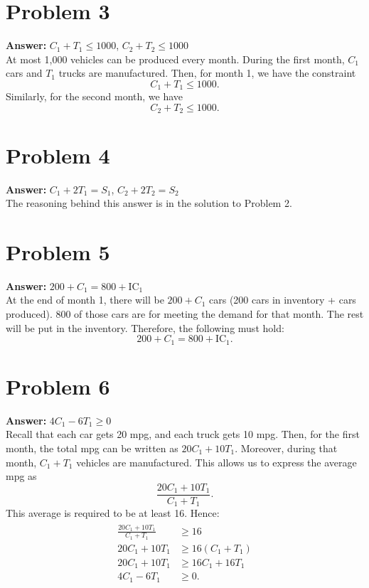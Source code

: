 \documentclass[11pt]{article}
\begin{document}
\section*{Problem 3}
\label{sec:org79f90ea}

\textbf{Answer:} \(C_1+T_1\leq 1000\), \(C_2+T_2\leq 1000\)\\

At most 1,000 vehicles can be produced every month. During the first month,
\(C_1\) cars and \(T_1\) trucks are manufactured. Then, for month 1, we have
the constraint
\begin{equation}
C_1+T_1\leq 1000.
\end{equation}
Similarly, for the second month, we have
\begin{equation}
C_2+T_2\leq 1000.
\end{equation}
\section*{Problem 4}
\label{sec:org8e8c157}

\textbf{Answer:} \(C_1+2T_1=S_1\), \(C_2+2T_2=S_2\)\\

The reasoning behind this answer is in the solution to Problem 2.
\section*{Problem 5}
\label{sec:org68d8c2e}

\textbf{Answer:} \(200+C_1=800+\mathrm{IC}_1\)\\

At the end of month 1, there will be \(200+C_1\) cars (200 cars in inventory +
cars produced). 800 of those cars are for meeting the demand for that month. The
rest will be put in the inventory. Therefore, the following must hold:
\begin{equation}
200+C_1=800+\mathrm{IC}_1.
\end{equation}
\section*{Problem 6}
\label{sec:org77d3ac5}

\textbf{Answer:} \(4C_1-6T_1\geq 0\)\\

Recall that each car gets 20 mpg, and each truck gets 10 mpg. Then, for the
first month, the total mpg can be written as \(20C_1+10T_1\). Moreover, during
that month, \(C_1+T_1\) vehicles are manufactured. This allows us to express
the average mpg as
\begin{equation*}
\frac{20C_1+10T_1}{C_1+T_1}.
\end{equation*}
This average is required to be at least 16. Hence:
\begin{align}
  \begin{split}
    \frac{20C_1+10T_1}{C_1+T_1}&\geq 16\\
    20C_1+10T_1&\geq 16(C_1+T_1)\\
    20C_1+10T_1&\geq 16C_1+16T_1\\
    4C_1-6T_1&\geq 0.
  \end{split}
\end{align}
\end{document}
